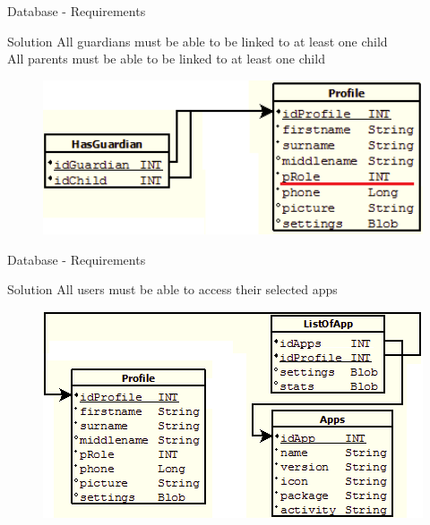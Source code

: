 \begin{frame}{Database - Requirements}
    \begin{block}{Solution}
					All guardians must be able to be linked to at least one child\\
					All parents must be able to be linked to at least one child

\begin{figure}[h]
	\centering
		\includegraphics[width=1.00\textwidth]{Img/DatabaseProfileRoleLink.png}
\end{figure}

   \end{block}
\end{frame}


\begin{frame}{Database - Requirements}
    \begin{block}{Solution}
	All users must be able to access their selected apps
\begin{figure}[h]
	\centering
		\includegraphics[width=1.00\textwidth]{Img/DatabaseProfileAppRelation.png}
\end{figure}

   \end{block}
\end{frame}

